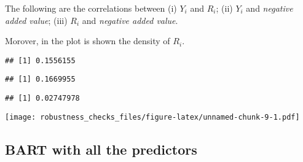 \documentclass[]{article}
\newenvironment{Shaded}{\begin{snugshade}}{\end{snugshade}}
\newcommand{\KeywordTok}[1]{\textcolor[rgb]{0.13,0.29,0.53}{\textbf{#1}}}
\newcommand{\NormalTok}[1]{#1}
\newcommand{\OperatorTok}[1]{\textcolor[rgb]{0.81,0.36,0.00}{\textbf{#1}}}
\begin{document}
The following are the correlations between (i) \(Y_i\) and \(R_i\); (ii)
\(Y_i\) and \textit{negative added value}; (iii) \(R_i\) and
\textit{negative added value}.

\par

Morover, in the plot is shown the density of \(R_i\).

\begin{Shaded}
\end{Shaded}

\begin{verbatim}
## [1] 0.1556155
\end{verbatim}

\begin{Shaded}
\end{Shaded}

\begin{verbatim}
## [1] 0.1669955
\end{verbatim}

\begin{Shaded}
\end{Shaded}

\begin{verbatim}
## [1] 0.02747978
\end{verbatim}

\begin{Shaded}
\end{Shaded}

\texttt{[image: robustness\_checks\_files/figure-latex/unnamed-chunk-9-1.pdf]}

\hypertarget{bart-with-all-the-predictors}{%
\subsection{BART with all the
predictors}\label{bart-with-all-the-predictors}}
\end{document}
